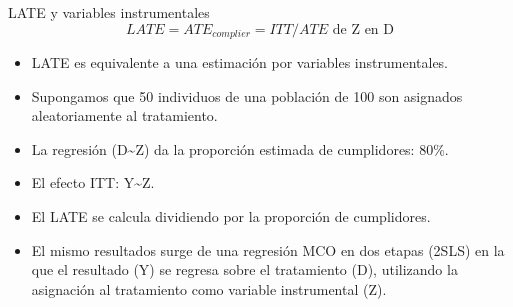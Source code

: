 \documentclass[
  ignorenonframetext,
]{beamer}
\begin{document}
\begin{frame}{LATE y variables instrumentales}
\protect\hypertarget{late-y-variables-instrumentales}{}
\[LATE = ATE_{complier} = ITT / ATE \text{ de Z en D}\]

\begin{itemize}
\item
  LATE es equivalente a una estimación por variables instrumentales.
\item
  Supongamos que 50 individuos de una población de 100 son asignados
  aleatoriamente al tratamiento.\pause 
\item
  La regresión (D\textasciitilde Z) da la proporción estimada de
  cumplidores: 80\%.
\item
  El efecto ITT: Y\textasciitilde Z. \pause
\item
  El LATE se calcula dividiendo por la proporción de cumplidores. \pause
\item
  El mismo resultados surge de una regresión MCO en dos etapas (2SLS) en
  la que el resultado (Y) se regresa sobre el tratamiento (D),
  utilizando la asignación al tratamiento como variable instrumental
  (Z).
\end{itemize}
\end{frame}
\end{document}
